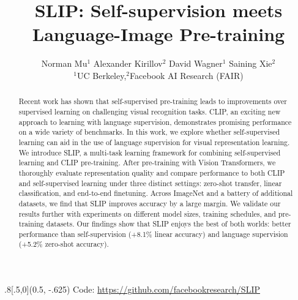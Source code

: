 \documentclass[10pt,twocolumn,letterpaper]{article}
\newcommand{\authorskip}{\hspace{2.5mm}}
\begin{document}
\title{\vspace{-1mm}\Large SLIP: Self-supervision meets Language-Image Pre-training \vspace{-3mm}}
\author{
 Norman Mu$^{1}$ \authorskip Alexander Kirillov$^{2}$ \authorskip David Wagner$^{1}$ \authorskip Saining Xie$^{2}$ \\[2mm]
 $^1$UC Berkeley,\quad $^2$Facebook AI Research (FAIR)}

\maketitle

\begin{abstract}
Recent work has shown that self-supervised pre-training leads to improvements over supervised learning on challenging visual recognition tasks.
CLIP, an exciting new approach to learning with language supervision, demonstrates promising performance on a wide variety of benchmarks.
In this work, we explore whether self-supervised learning can aid in the use of language supervision for visual representation learning. 
We introduce SLIP, a multi-task learning framework for combining self-supervised learning and CLIP pre-training.
After pre-training with Vision Transformers, we thoroughly evaluate representation quality and compare performance to both CLIP and self-supervised learning under three distinct settings: zero-shot transfer, linear classification, and end-to-end finetuning. Across ImageNet and a battery of additional datasets, we find that SLIP improves accuracy by a large margin.
We validate our results further with experiments on different model sizes, training schedules, and pre-training datasets.
Our findings show that SLIP enjoys the best of both worlds: better performance than self-supervision (+8.1\% linear accuracy) and language supervision (+5.2\% zero-shot accuracy).
\end{abstract}\hspace{-1.8em}

\begin{textblock*}{.8\textwidth}[.5,0](0.5\textwidth, -.625\textwidth)
\centering
{\small Code: \url{https://github.com/facebookresearch/SLIP}}
\end{textblock*}
\end{document}
